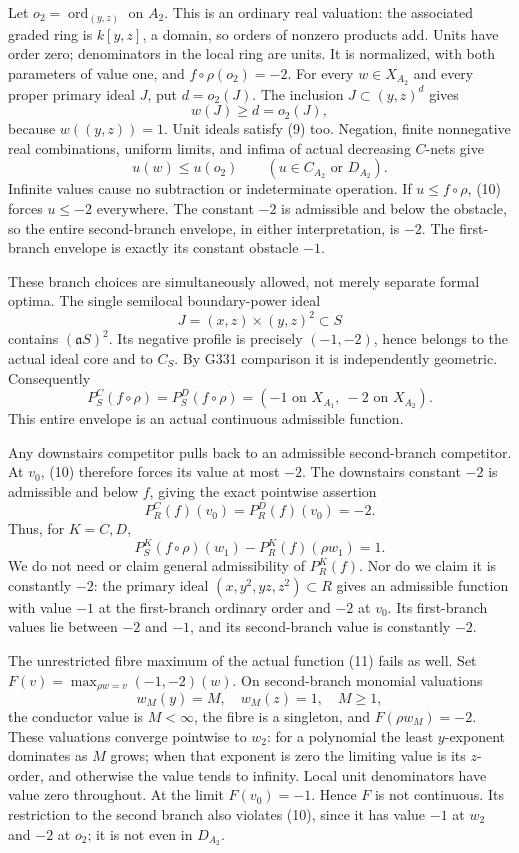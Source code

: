 \documentclass[11pt]{article}
\begin{document}
Let \(o_2=\operatorname{ord}_{(y,z)}\) on \(A_2\).
This is an ordinary real valuation: the associated graded ring is
\(k[y,z]\), a domain, so orders of nonzero products add.
Units have order zero; denominators in the local ring are units.
It is normalized, with both parameters of value one, and
\(f\circ\rho(o_2)=-2\).
For every \(w\in X_{A_2}\) and every proper primary ideal \(J\),
put \(d=o_2(J)\). The inclusion \(J\subset(y,z)^d\) gives
\[
 w(J)\geq d=o_2(J),                                           \tag{9}
\]
because \(w((y,z))=1\). Unit ideals satisfy (9) too.
Negation, finite nonnegative real combinations, uniform limits,
and infima of actual decreasing \(C\)-nets give
\[
 u(w)\leq u(o_2)\qquad(u\in C_{A_2}\text{ or }D_{A_2}).         \tag{10}
\]
Infinite values cause no subtraction or indeterminate operation.
If \(u\leq f\circ\rho\), (10) forces \(u\leq-2\) everywhere.
The constant \(-2\) is admissible and below the obstacle, so the
entire second-branch envelope, in either interpretation, is \(-2\).
The first-branch envelope is exactly its constant obstacle \(-1\).

These branch choices are simultaneously allowed, not merely separate
formal optima. The single semilocal boundary-power ideal
\[
 J=(x,z)\times(y,z)^2\subset S
\]
contains \((\mathfrak aS)^2\). Its negative profile is precisely
\((-1,-2)\), hence belongs to the actual ideal core and to \(C_S\).
By G331 comparison it is independently geometric. Consequently
\[
 P_S^C(f\circ\rho)=P_S^D(f\circ\rho)
       =(-1\text{ on }X_{A_1},\ -2\text{ on }X_{A_2}).          \tag{11}
\]
This entire envelope is an actual continuous admissible function.

Any downstairs competitor pulls back to an admissible second-branch
competitor. At \(v_0\), (10) therefore forces its value at most
\(-2\). The downstairs constant \(-2\) is admissible and below \(f\),
giving the exact pointwise assertion
\[
 P_R^C(f)(v_0)=P_R^D(f)(v_0)=-2.                               \tag{12}
\]
Thus, for \(K=C,D\),
\[
 P_S^K(f\circ\rho)(w_1)-P_R^K(f)(\rho w_1)=1.                 \tag{13}
\]
We do not need or claim general admissibility of \(P_R^K(f)\).
Nor do we claim it is constantly \(-2\): the primary ideal
\((x,y^2,yz,z^2)\subset R\) gives an admissible function with
value \(-1\) at the first-branch ordinary order and \(-2\) at \(v_0\).
Its first-branch values lie between \(-2\) and \(-1\), and its
second-branch value is constantly \(-2\).

The unrestricted fibre maximum of the actual function (11) fails as
well. Set \(F(v)=\max_{\rho w=v}(-1,-2)(w)\).
On second-branch monomial valuations
\[
 w_M(y)=M,\quad w_M(z)=1,\quad M\geq1,
\]
the conductor value is \(M<\infty\), the fibre is a singleton, and
\(F(\rho w_M)=-2\). These valuations converge pointwise to \(w_2\):
for a polynomial the least \(y\)-exponent dominates as \(M\) grows;
when that exponent is zero the limiting value is its \(z\)-order,
and otherwise the value tends to infinity. Local unit denominators
have value zero throughout. At the limit \(F(v_0)=-1\).
Hence \(F\) is not continuous. Its restriction to the second
branch also violates (10), since it has value \(-1\) at \(w_2\)
and \(-2\) at \(o_2\); it is not even in \(D_{A_2}\).
\end{document}
